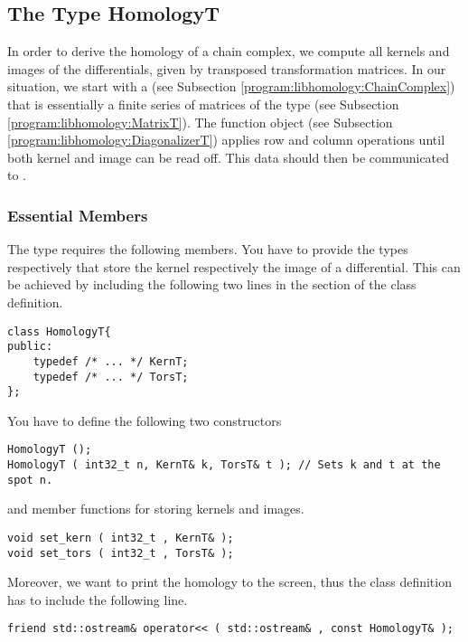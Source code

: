 \subsection{The Type HomologyT}
\label{program:libhomology:HomologyT}
In order to derive the homology of a chain complex, we compute all kernels and images of the differentials, given by transposed transformation matrices.
In our situation, we start with a  (see Subsection \ref{program:libhomology:ChainComplex}) that is essentially a finite series of matrices of the type  (see Subsection \ref{program:libhomology:MatrixT}).
The function object  (see Subsection \ref{program:libhomology:DiagonalizerT}) applies row and column operations until both kernel and image can be read off.
This data should then be communicated to .

\subsubsection{Essential Members}
The type  requires the following members.
You have to provide the types \progname{::} respectively \progname{::} that store the kernel respectively the image of a differential.
This can be achieved by including the following two lines in the  section of the class definition.
\begin{lstlisting}
class HomologyT{
public:
    typedef /* ... */ KernT;
    typedef /* ... */ TorsT;
};
\end{lstlisting}
You have to define the following two constructors
\begin{lstlisting}
HomologyT ();
HomologyT ( int32_t n, KernT& k, TorsT& t ); // Sets k and t at the spot n.
\end{lstlisting}
and member functions for storing kernels and images.
\begin{lstlisting}
void set_kern ( int32_t , KernT& );
void set_tors ( int32_t , TorsT& );
\end{lstlisting}
Moreover, we want to print the homology to the screen, thus the class definition has to include the following line.
\begin{lstlisting}
friend std::ostream& operator<< ( std::ostream& , const HomologyT& );
\end{lstlisting}

